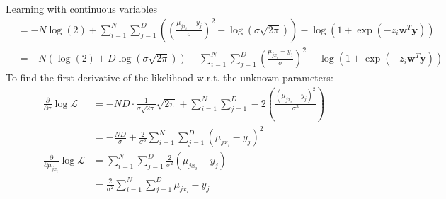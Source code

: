 \documentclass{ml}
\begin{document}
\begin{question}{Learning with continuous variables}
\begin{align*}
            &= -N\log(2) + \sum\limits_{i=1}^N \sum \limits_{j=1}^D
                \left( \left( \frac{\mu_{j{x_i}}-y_j}{\sigma}\right)^2 -
                \log (\sigma\sqrt{2\pi})\right) - 
                \log(1+\exp(-z_i\textbf{w}^T\textbf{y})) \\
            &= -N(\log(2) + D\log(\sigma\sqrt{2\pi})) +
                \sum\limits_{i=1}^N \sum\limits_{j=1}^D \left(
                \frac{\mu_{jx_i}-y_j}{\sigma} \right)^2 - \log
                (1+\exp(-z_i\textbf{w}^T\textbf{y}))
        \end{align*}
        To find the first derivative of the likelihood w.r.t. the
        unknown parameters:
        \begin{align*}
            \frac{\partial}{\partial\sigma}\log \mathcal{L}
            &= -ND\cdot \frac{1}{\sigma\sqrt{2\pi}} \sqrt{2\pi} +
                \sum\limits_{i=1}^N \sum\limits_{j=1}^D -2 \left(
                \frac{(\mu_{jx_i}-y_j)^2}{\sigma^3} \right) \\
            &= -\frac{ND}{\sigma} + \frac{2}{\sigma^3} 
                \sum\limits_{i=1}^N \sum\limits_{j=1}^D
                (\mu_{jx_i}-y_j)^2 \\
            \frac{\partial}{\partial\mu_{jx_i}} \log \mathcal{L}
            &= \sum\limits_{i=1}^N \sum\limits_{j=1}^D
                \frac{2}{\sigma^2} (\mu_{jx_i}-y_j) \\
            &= \frac{2}{\sigma^2} \sum\limits_{i=1}^N
                \sum\limits_{j=1}^D \mu_{jx_i}-y_j
        \end{align*}
\end{question} %
\end{document}
